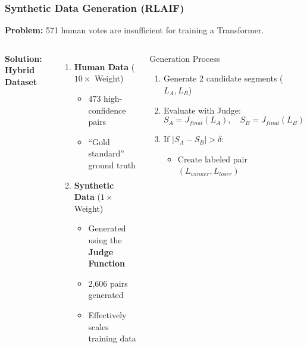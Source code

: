 \documentclass{beamer}
\begin{document}
\begin{frame}
\frametitle{Synthetic Data Generation (RLAIF)}

\textbf{Problem:} 571 human votes are insufficient for training a Transformer.

\vspace{0.5em}
\begin{columns}
\textbf{Solution: Hybrid Dataset}
\begin{enumerate}
    \item \textbf{Human Data} ($10\times$ Weight)
    \begin{itemize}
        \item 473 high-confidence pairs
        \item ``Gold standard'' ground truth
    \end{itemize}
    
    \vspace{0.5em}
    \item \textbf{Synthetic Data} ($1\times$ Weight)
    \begin{itemize}
        \item Generated using the \textbf{Judge Function}
        \item 2,606 pairs generated
        \item Effectively scales training data
    \end{itemize}
\end{enumerate}

\begin{block}{Generation Process}
\begin{enumerate}
    \item Generate 2 candidate segments ($L_A, L_B$)
    \item Evaluate with Judge:
    $$S_A = J_{final}(L_A), \quad S_B = J_{final}(L_B)$$
    \item If $|S_A - S_B| > \delta$:
    \begin{itemize}
        \item Create labeled pair $(L_{winner}, L_{loser})$
    \end{itemize}
\end{enumerate}
\end{block}
\end{columns}

\end{frame}
\end{document}
